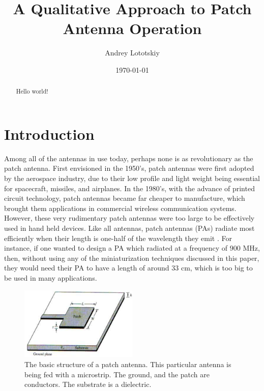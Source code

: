 \documentclass[12pt]{article}
\title{A Qualitative Approach to Patch Antenna Operation}
\author{Andrey Lototskiy}
\date{\today}
\begin{document}
\maketitle

\begin{abstract}
Hello world!
\end{abstract}

\section{Introduction}
Among all of the antennas in use today, perhaps none is as revolutionary as the patch antenna. First envisioned in the 1950's\cite{gutton1955flat}, patch antennas were first adopted by the aerospace industry\cite{balanis2016antenna}, due to their low profile and light weight being essential for spacecraft, missiles, and airplanes. In the 1980's, with the advance of printed circuit technology, patch antennas became far cheaper to manufacture\cite{khan2015microstrip}, which brought them applications in commercial wireless communication systems. 
However, these very rudimentary patch antennas were too large to be effectively used in hand held devices. Like all antennas, patch antennas (PAs) radiate most efficiently when their length is one-half of the wavelength they emit \cite{khan2015microstrip}. For instance, if one wanted to design a PA which radiated at a frequency of $900$ MHz, then, without using any of the miniaturization techniques discussed in this paper, they would need their PA to have a length of around $33$ cm, which is too big to be used in many applications. 

\begin{figure}[h]
    \centering
    \includegraphics[width=0.5\textwidth]{patch-antenna-structure.png}
    \caption{The basic structure of a patch antenna. This particular antenna is being fed with a microstrip. The ground, and the patch are conductors. The substrate is a dielectric. \cite{girase2014design}}
\end{figure}
\end{document}
